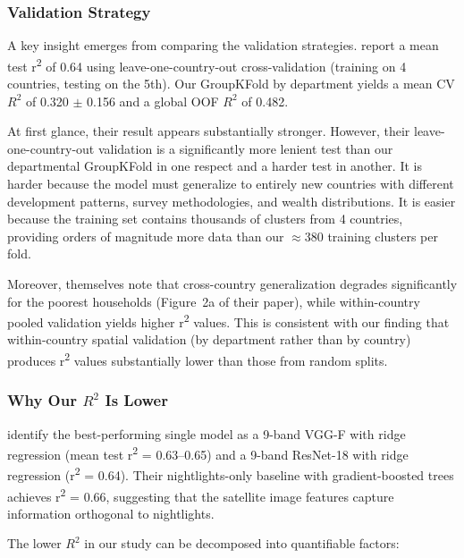 \documentclass[11pt,a4paper]{article}
\newcommand{\Rtwo}{\ensuremath{R^2}}
\begin{document}
\subsubsection{Validation Strategy}

A key insight emerges from comparing the validation strategies. \citet{perez2017} report a mean test r\textsuperscript{2} of 0.64 using leave-one-country-out cross-validation (training on 4 countries, testing on the 5th). Our GroupKFold by department yields a mean CV \Rtwo{} of 0.320 $\pm$ 0.156 and a global OOF \Rtwo{} of 0.482.

At first glance, their result appears substantially stronger. However, their leave-one-country-out validation is a significantly more lenient test than our departmental GroupKFold in one respect and a harder test in another. It is harder because the model must generalize to entirely new countries with different development patterns, survey methodologies, and wealth distributions. It is easier because the training set contains thousands of clusters from 4 countries, providing orders of magnitude more data than our $\approx$380 training clusters per fold.

Moreover, \citet{perez2017} themselves note that cross-country generalization degrades significantly for the poorest households (Figure~2a of their paper), while within-country pooled validation yields higher r\textsuperscript{2} values. This is consistent with our finding that within-country spatial validation (by department rather than by country) produces r\textsuperscript{2} values substantially lower than those from random splits.

\subsubsection{Why Our \Rtwo{} Is Lower}

\citet{perez2017} identify the best-performing single model as a 9-band VGG-F with ridge regression (mean test r\textsuperscript{2} = 0.63--0.65) and a 9-band ResNet-18 with ridge regression (r\textsuperscript{2} = 0.64). Their nightlights-only baseline with gradient-boosted trees achieves r\textsuperscript{2} = 0.66, suggesting that the satellite image features capture information orthogonal to nightlights.

The lower \Rtwo{} in our study can be decomposed into quantifiable factors:
\end{document}
